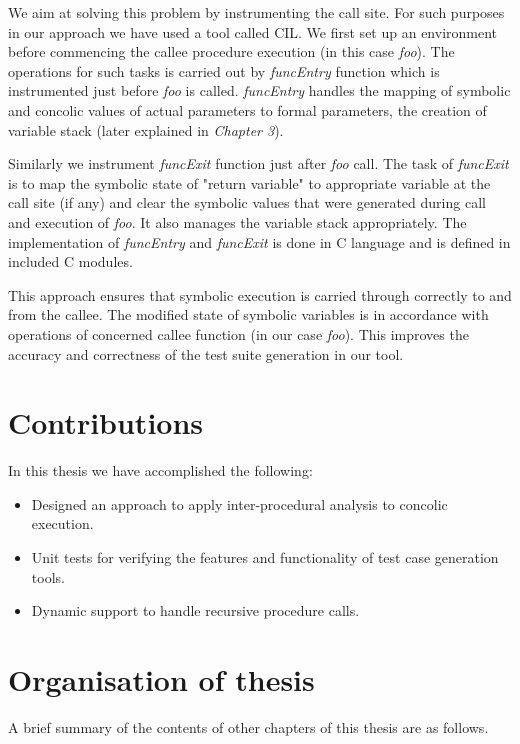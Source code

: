 \documentclass[12pt,oneside]{book}
\begin{document}
We aim at solving this problem by instrumenting the call site. For such purposes in our approach we have used a tool called CIL\cite{cil}. We first set up an environment before commencing the callee procedure execution (in this case \textit{foo}). The operations for such tasks is carried out by \textit{funcEntry} function which is instrumented just before \textit{foo} is called. \textit{funcEntry} handles the mapping of symbolic and concolic values of actual parameters to formal parameters, the creation of variable stack (later explained in \textit{Chapter 3}).

Similarly we instrument \textit{funcExit} function just after \textit{foo} call. The task of \textit{funcExit} is to map the symbolic state of "return variable" to appropriate variable at the call site (if any) and clear the symbolic values that were generated during call and execution of \textit{foo}. It also manages the variable stack appropriately. The implementation of \textit{funcEntry} and \textit{funcExit} is done in C language and is defined in included C modules.

This approach ensures that symbolic execution is carried through correctly to and from the callee. The modified state of symbolic variables is in accordance with operations of concerned callee function (in our case \textit{foo}). This improves the accuracy and correctness of the test suite generation in our tool.  


\section {Contributions}
In this thesis we have accomplished the following:
\begin{itemize}
  \item Designed an approach to apply inter-procedural analysis to concolic execution. 
  \item Unit tests for verifying the features and functionality of test case generation tools. 
  \item Dynamic support to handle recursive procedure calls. 
\end{itemize}


\section {Organisation of thesis}
A brief summary of the contents of other chapters of this thesis are as follows.\\
\end{document}
